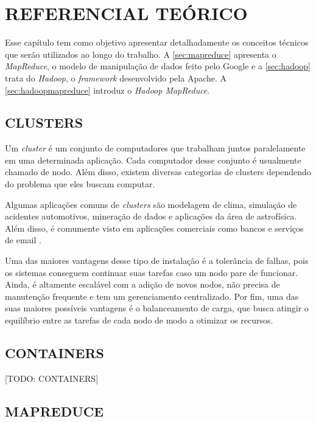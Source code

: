 \chapter{REFERENCIAL TEÓRICO} \label{cha:refteorico}

Esse capítulo tem como objetivo apresentar detalhadamente os conceitos técnicos que serão utilizados ao longo do trabalho. A \autoref{sec:mapreduce} apresenta o \textit{MapReduce}, o modelo de manipulação de dados feito pelo Google e a \autoref{sec:hadoop} trata do \textit{Hadoop}, o \textit{framework} desenvolvido pela Apache. A \autoref{sec:hadoopmapreduce} introduz o \textit{Hadoop MapReduce}.

\section{CLUSTERS} \label{sec:clusters}

Um \textit{cluster} é um conjunto de computadores que trabalham juntos paralelamente em uma determinada aplicação. Cada computador desse conjunto é usualmente chamado de nodo. Além disso, existem diversas categorias de clusters dependendo do problema que eles buscam computar.

Algumas aplicações comuns de \textit{clusters} são modelagem de clima, simulação de acidentes automotivos, mineração de dados e aplicações da área de astrofísica. Além disso, é comumente visto em aplicações comerciais como bancos e serviços de email \cite{ClusterGridCloudComparison11}.

Uma das maiores vantagens desse tipo de instalação é a tolerância de falhas, pois os sistemas conseguem continuar suas tarefas caso um nodo pare de funcionar. Ainda, é altamente escalável com a adição de novos nodos, não precisa de manutenção frequente e tem um gerenciamento centralizado. Por fim, uma das suas maiores possíveis vantagens é o balanceamento de carga, que busca atingir o equilíbrio entre as tarefas de cada nodo de modo a otimizar os recursos.

\section{CONTAINERS} \label{sec:containers}

[TODO: CONTAINERS]


\section{MAPREDUCE} \label{sec:mapreduce}

